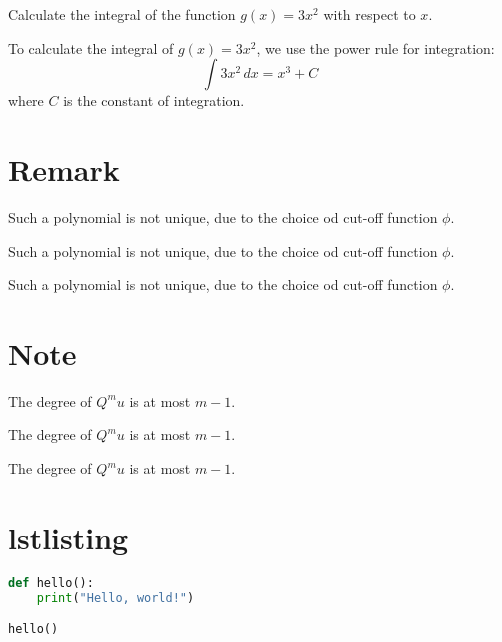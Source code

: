 \documentclass{article}
\begin{document}
\begin{problem*}
    Calculate the integral of the function $g(x) = 3x^2$ with respect to $x$.
\end{problem*}
\begin{solution*}
    To calculate the integral of $g(x) = 3x^2$, we use the power rule for integration:
    \[
        \int 3x^2 \, dx = x^3 + C
    \]
    where $C$ is the constant of integration.
\end{solution*}

\section{Remark}

\begin{remark}
    Such a polynomial is not unique, due to the choice od cut-off function $\phi$.
\end{remark}

\begin{remark}[xxx]
    Such a polynomial is not unique, due to the choice od cut-off function $\phi$.
\end{remark}

\begin{remark*}
    Such a polynomial is not unique, due to the choice od cut-off function $\phi$.
\end{remark*}

\section{Note}

\begin{note}
    The degree of $Q^m u$ is at most $m-1$.
\end{note}

\begin{note}[xxx]
    The degree of $Q^m u$ is at most $m-1$.
\end{note}

\begin{note*}
    The degree of $Q^m u$ is at most $m-1$.
\end{note*}


\section{lstlisting}

\begin{lstlisting}[language=Python,caption={hello world}]
def hello():
    print("Hello, world!")

hello()
\end{lstlisting}
\end{document}
